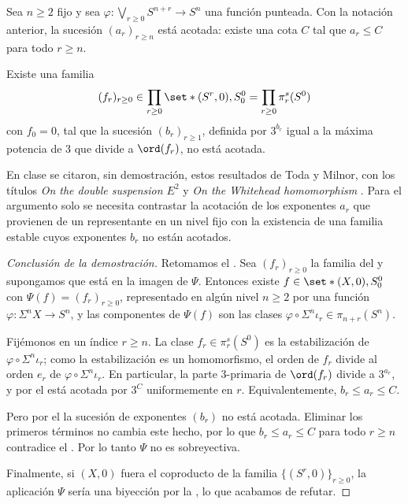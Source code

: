 \begin{teo}[Toda]\label{teo:toda}
Sea $n\ge2$ fijo y sea $\varphi\colon\bigvee_{r\ge0}S^{n+r}\to S^n$ una función punteada. Con la notación anterior, la sucesión $(a_r)_{r\ge n}$ está acotada: existe una cota $C$ tal que $a_r\le C$ para todo $r\ge n$.
\end{teo}

\begin{teo}[Milnor]\label{teo:milnor}
Existe una familia
\[
(f_r)_{r\ge0}\in\prod_{r\ge0}\set*{(S^r,0),S^0_0}=\prod_{r\ge0}\pi_r^s(S^0)
\]
con $f_0=0$, tal que la sucesión $(b_r)_{r\ge1}$, definida por $3^{b_r}$ igual a la máxima potencia de $3$ que divide a $\ord(f_r)$, no está acotada.
\end{teo}

\begin{nota}
   En clase se citaron, sin demostración, estos resultados de Toda y Milnor, con los títulos \emph{On the double suspension $E^2$} \cite{toda1956} y \emph{On the Whitehead homomorphism} \cite{milnor1958}. Para el argumento solo se necesita contrastar la acotación de los exponentes $a_r$ que provienen de un representante en un nivel fijo con la existencia de una familia estable cuyos exponentes $b_r$ no están acotados.
\end{nota}

\begin{proof}[Conclusión de la demostración]
Retomamos el . Sea $(f_r)_{r\ge0}$ la familia del  y supongamos que está en la imagen de $\Psi$. Entonces existe $f\in\set*{(X,0),S^0_0}$ con $\Psi(f)=(f_r)_{r\ge0}$, representado en algún nivel $n\geq2$ por una función $\varphi\colon\Sigma^nX\to S^n$, y las componentes de $\Psi(f)$ son las clases $\varphi\circ\Sigma^n\iota_r\in\pi_{n+r}(S^n)$.

Fijémonos en un índice $r\ge n$. La clase $f_r\in\pi_r^s(S^0)$ es la estabilización de $\varphi\circ\Sigma^n\iota_r$; como la estabilización es un homomorfismo, el orden de $f_r$ divide al orden $e_r$ de $\varphi\circ\Sigma^n\iota_r$. En particular, la parte $3$-primaria de $\ord(f_r)$ divide a $3^{a_r}$, y por el  está acotada por $3^C$ uniformemente en $r$. Equivalentemente, $b_r\le a_r\le C$.

Pero por el  la sucesión de exponentes $(b_r)$ no está acotada. Eliminar los primeros términos no cambia este hecho, por lo que $b_r\le a_r\le C$ para todo $r\ge n$ contradice el . Por lo tanto $\Psi$ no es sobreyectiva.

Finalmente, si $(X,0)$ fuera el coproducto de la familia $\{(S^r,0)\}_{r\ge0}$, la aplicación $\Psi$ sería una biyección por la , lo que acabamos de refutar.
\end{proof}

